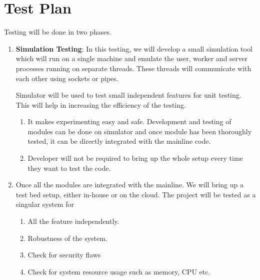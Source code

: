 \section*{Test Plan} {
	Testing will be done in two phases.
	\begin{enumerate}
		\item {
			\textbf{Simulation Testing}: In this testing, we will develop a small simulation tool which will run on a single machine and emulate the user, worker and server processes running on separate threads. These threads will communicate with each other using sockets or pipes.
			
			Simulator will be used to test small independent features for unit testing. This will help in increasing the efficiency of the testing. 
			
			\begin{enumerate}
				\item It makes experimenting easy and safe. Development and testing of modules can be done on simulator and once module has been thoroughly tested, it can be directly integrated with the mainline code. 
				\item Developer will not be required to bring up the whole setup every time they want to test the code.
			\end{enumerate}
		}
	
		\item {
			Once all the modules are integrated with the mainline. We will bring up a test bed setup, either in-house or on the cloud. The project will be tested as a singular system for
			
			\begin{enumerate}
				\item All the feature independently.
				
				\item Robustness of the system.
				
				\item Check for security flaws
				
				\item Check for system resource usage such as memory, CPU etc.
			\end{enumerate}
		}
	\end{enumerate}
	
}
